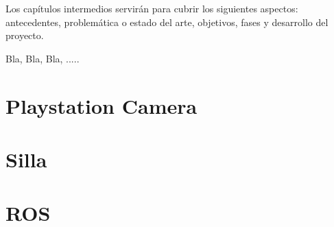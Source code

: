 
Los capítulos intermedios servirán para cubrir los siguientes aspectos:
antecedentes, problemática o estado del arte, objetivos, fases y desarrollo del proyecto.

Bla, Bla, Bla, .....


\section{Playstation Camera}
\label{3:sec1}


\section{Silla}
\label{3:sec2}


\section{ROS}
\label{3:sec3}
